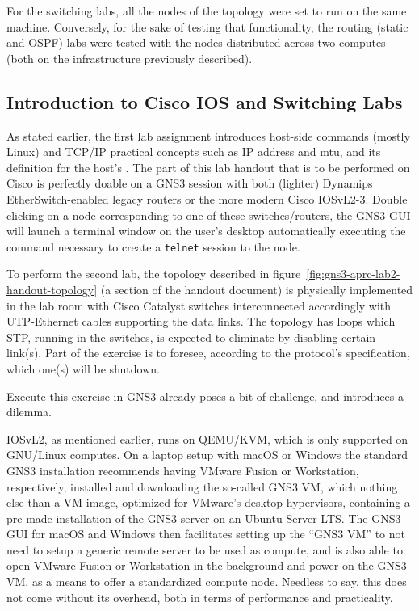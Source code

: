 For the switching labs, all the nodes of the topology were set to run on the same machine.
Conversely, for the sake of testing that functionality, the routing (static and OSPF) labs were tested with the nodes distributed across two computes (both on the infrastructure previously described).



\subsection{Introduction to Cisco IOS and Switching Labs}
\label{subsec:gns3introswitching}

As stated earlier, the first lab assignment introduces host-side commands (mostly Linux) and TCP/IP practical concepts such as IP address and \acrshort{mtu}, and its definition for the host's .
The part of this lab handout that is to be performed on Cisco is perfectly doable on a GNS3 session with both (lighter) Dynamips EtherSwitch-enabled legacy routers or the more modern Cisco IOSvL2-3.
Double clicking on a node corresponding to one of these switches/routers, the GNS3 GUI will launch a terminal window on the user's desktop automatically executing the command necessary to create a \texttt{telnet} session to the node.

To perform the second lab, the topology described in figure~\ref{fig:gns3-aprc-lab2-handout-topology} (a section of the handout document) is physically implemented in the lab room with Cisco Catalyst switches interconnected accordingly with UTP-Ethernet cables supporting the data links.
The topology has loops which STP, running in the switches, is expected to eliminate by disabling certain link(s).
Part of the exercise is to foresee, according to the protocol's specification, which one(s) will be shutdown.

Execute this exercise in GNS3 already poses a bit of challenge, and introduces a dilemma.

IOSvL2, as mentioned earlier, runs on QEMU/KVM, which is only supported on GNU/Linux computes.
On a laptop setup with macOS or Windows the standard GNS3 installation recommends having VMware Fusion or Workstation, respectively, installed and downloading the so-called GNS3 VM, which nothing else than a VM image, optimized for VMware's desktop hypervisors, containing a pre-made installation of the GNS3 server on an Ubuntu Server LTS.
The GNS3 GUI for macOS and Windows then facilitates setting up the ``GNS3 VM'' to not need to setup a generic remote server to be used as compute, and is also able to open VMware Fusion or Workstation in the background and power on the GNS3 VM, as a means to offer a standardized compute node.
Needless to say, this does not come without its overhead, both in terms of performance and practicality.

